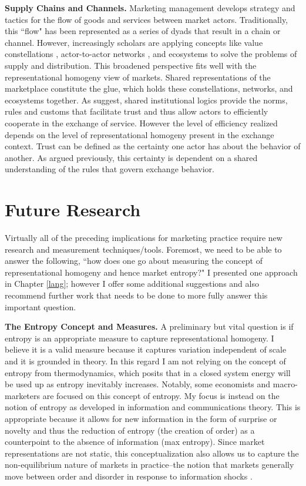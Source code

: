 \textbf{Supply Chains and Channels.}
Marketing management develops strategy and tactics for the flow of goods and services between market actors. Traditionally, this ``flow" has been represented as a series of dyads that result in a chain or channel. However, increasingly scholars are applying concepts like value constellations \citep{normann1993}, actor-to-actor networks \citep{vargo2011}, and ecosystems \citep{mars2012} to solve the problems of supply and distribution. This broadened perspective fits well with the representational homogeny view of markets. Shared representations of the marketplace constitute the glue, which holds these constellations, networks, and ecosystems together. As \citet{vargo2011} suggest, shared institutional logics provide the norms, rules and customs that facilitate trust and thus allow actors to efficiently cooperate in the exchange of service. However the level of efficiency realized depends on the level of representational homogeny present in the exchange context. Trust can be defined as the certainty one actor has about the behavior of another. As argued previously, this certainty is dependent on a shared understanding of the rules that govern exchange behavior. 

\section{Future Research}
Virtually all of the preceding implications for marketing practice require new research and measurement techniques/tools. Foremost, we need to be able to answer the following, ``how does one go about measuring the concept of representational homogeny and hence market entropy?" I presented one approach in Chapter \ref{lang}; however I offer some additional suggestions and also recommend further work that needs to be done to more fully answer this important question. 

\textbf{The Entropy Concept and Measures.}
A preliminary but vital question is if entropy is an appropriate measure to capture representational homogeny. I believe it is a valid measure because it captures variation independent of scale and it is grounded in theory. In this regard I am not relying on the concept of entropy from thermodynamics, which posits that in a closed system energy will be used up as entropy inevitably increases. Notably, some economists \citep[see e.g.][]{georgescu1971, rifkin1980} and macro-marketers \citep{kilbourne1997} are focused on this concept of entropy. My focus is instead on the notion of entropy as developed in information and communications theory. This is appropriate because it allows for new information in the form of surprise or novelty and thus the reduction of entropy (the creation of order) as a counterpoint to the absence of information (max entropy). Since market representations are not static, this conceptualization also allows us to capture the non-equilibrium nature of markets in practice--the notion that markets generally move between order and disorder in response to information shocks \citep{hunt1999, dickson1992}. 

